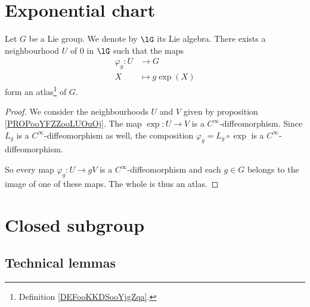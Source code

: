 

\section{Exponential chart}

\begin{proposition}	\label{PROPooVMLTooFpXoeh}
	Let \( G\) be a Lie group. We denote by \( \lG\) its Lie algebra. There exists a neighbourhood \( U\) of \( 0\) in \( \lG\) such that the maps
	\begin{equation}
		\begin{aligned}
			\varphi_g\colon U & \to G            \\
			X                 & \mapsto g\exp(X)
		\end{aligned}
	\end{equation}
	form an atlas\footnote{Definition \ref{DEFooKKDSooYjgZqa}.} of \( G\).
\end{proposition}

\begin{proof}
	We consider the neighbourhoods \( U\) and \( V\) given by proposition \ref{PROPooYFZZooLUOuOj}. The map \(\exp \colon U\to V  \) is a \( C^{\infty}\)-diffeomorphism. Since \( L_g\) is a \( C^{\infty}\)-diffeomorphism as well, the composition \( \varphi_g=L_g\circ\exp\) is a \( C^{\infty}\)-diffeomorphism.

	So every map \(\varphi_g \colon U\to gV  \) is a \( C^{\infty}\)-diffeomorphism and each \( g\in G\) belongs to the image of one of these maps. The whole is thus an atlas.
\end{proof}

\section{Closed subgroup}

\subsection{Technical lemmas}


